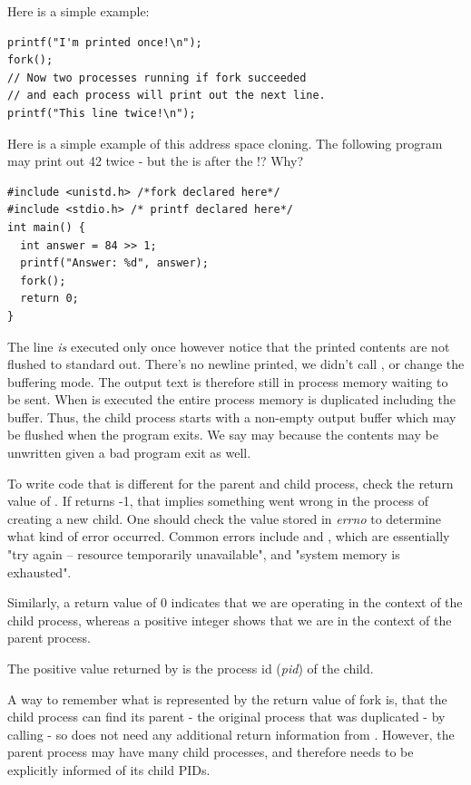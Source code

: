 Here is a simple example:

\begin{verbatim}
printf("I'm printed once!\n");
fork();
// Now two processes running if fork succeeded
// and each process will print out the next line.
printf("This line twice!\n");
\end{verbatim}

Here is a simple example of this address space cloning.
The following program may print out 42 twice - but the  is after the !? Why?

\begin{verbatim}
#include <unistd.h> /*fork declared here*/
#include <stdio.h> /* printf declared here*/
int main() {
  int answer = 84 >> 1;
  printf("Answer: %d", answer);
  fork();
  return 0;
}
\end{verbatim}

The  line \emph{is} executed only once however notice that the printed contents are not flushed to standard out.
There's no newline printed, we didn't call , or change the buffering mode.
The output text is therefore still in process memory waiting to be sent.
When  is executed the entire process memory is duplicated including the buffer.
Thus, the child process starts with a non-empty output buffer which may be flushed when the program exits.
We say may because the contents may be unwritten given a bad program exit as well.

To write code that is different for the parent and child process, check the return value of .
If  returns -1, that implies something went wrong in the process of creating a new child.
One should check the value stored in \emph{errno} to determine what kind of error occurred.
Common errors include  and , which are essentially "try again -- resource temporarily unavailable", and "system memory is exhausted".

Similarly, a return value of 0 indicates that we are operating in the context of the child process, whereas a positive integer shows that we are in the context of the parent process.

The positive value returned by  is the process id (\emph{pid}) of the child.

A way to remember what is represented by the return value of fork is, that the child process can find its parent - the original process that was duplicated - by calling  - so does not need any additional return information from . However, the parent process may have many child processes, and therefore needs to be explicitly informed of its child PIDs.

